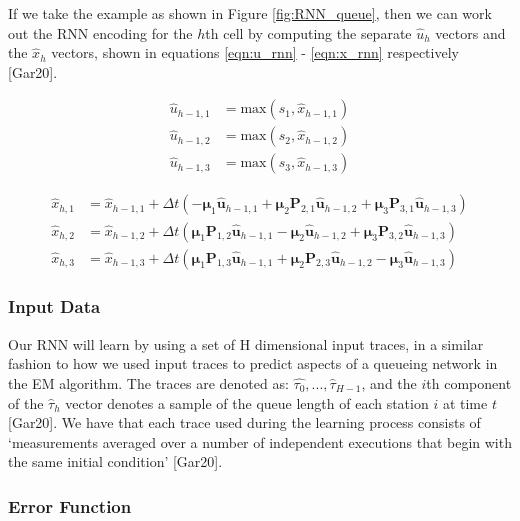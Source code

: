 \documentclass[a4paper,11pt,titlepage]{article}
\begin{document}
If we take the example as shown in Figure \ref{fig:RNN_queue}, then we can work out the RNN encoding for the $h$th cell by computing the separate $\hat{u}_h$ vectors and the $\hat{x}_h$ vectors, shown in equations \ref{eqn:u_rnn} - \ref{eqn:x_rnn} respectively [Gar20].

\begin{align}
    \label{eqn:u_rnn}
    \hat{u}_{h-1,1} &= \text{max} (s_1, \hat{x}_{h-1,1}) \\
    \hat{u}_{h-1,2} &= \text{max} (s_2, \hat{x}_{h-1,2}) \\
    \hat{u}_{h-1,3} &= \text{max} (s_3, \hat{x}_{h-1,3})
\end{align}


\begin{align}
\hat{x}_{h,1} &= \hat{x}_{h-1,1} + \Delta t (- \bm{\mu}_1 \mathbf{\hat{u}}_{h-1,1} + \bm{\mu}_2 \mathbf{P}_{2,1} \mathbf{\hat{u}}_{h-1,2} + \bm{\mu}_3 \mathbf{P}_{3,1} \mathbf{\hat{u}}_{h-1,3}) \\
\hat{x}_{h,2} &= \hat{x}_{h-1,2} + \Delta t ( \bm{\mu}_1 \mathbf{P}_{1,2} \mathbf{\hat{u}}_{h-1,1} - \bm{\mu}_2 \mathbf{\hat{u}}_{h-1,2} + \bm{\mu}_3 \mathbf{P}_{3,2} \mathbf{\hat{u}}_{h-1,3}) \\
\hat{x}_{h,3} &= \hat{x}_{h-1,3} + \Delta t ( \bm{\mu}_1 \mathbf{P}_{1,3} \mathbf{\hat{u}}_{h-1,1} + \bm{\mu}_2 \mathbf{P}_{2,3} \mathbf{\hat{u}}_{h-1,2} - \bm{\mu}_3 \mathbf{\hat{u}}_{h-1,3})
\label{eqn:x_rnn}
\end{align}

\subsubsection{Input Data} 

Our RNN will learn by using a set of H dimensional input traces, in a similar fashion to how we used input traces to predict aspects of a queueing network in the EM algorithm. The traces are denoted as: $\hat{\tau_0},...,\hat{\tau}_{H-1}$, and the $i$th component of the $\hat{\tau}_h$ vector denotes a sample of the queue length of each station $i$ at time $t$ [Gar20]. We have that each trace used during the learning process consists of `measurements averaged over a number of independent executions that begin with the same initial condition' [Gar20]. 

\subsubsection{Error Function}
\end{document}
